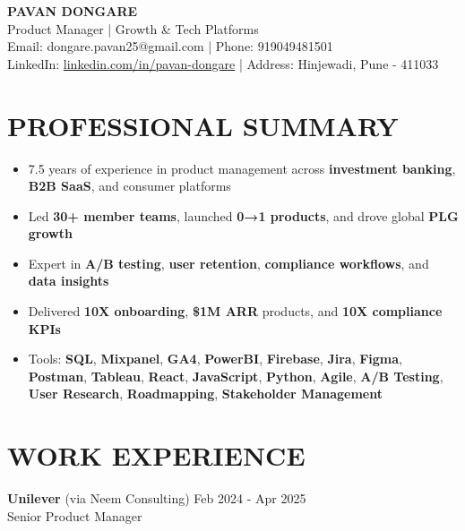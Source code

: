 \documentclass[10pt,a4paper]{article}
\newcommand{\experienceitem}[4]{
    #1 \hfill #2 \\
    #3 \hfill \textit{#4}
}
\begin{document}
\vspace*{1\baselineskip} %

\begin{center}
    \textbf{\Large PAVAN DONGARE} \\
    Product Manager | Growth \& Tech Platforms \\
    Email: dongare.pavan25@gmail.com | Phone: 919049481501 \\
    LinkedIn: \href{https://linkedin.com/in/pavan-dongare}{linkedin.com/in/pavan-dongare} | Address: Hinjewadi, Pune - 411033
\end{center}

\section{PROFESSIONAL SUMMARY}
\begin{itemize}[leftmargin=*,itemsep=1pt,topsep=1pt]
    \item 7.5 years of experience in product management across \textbf{investment banking}, \textbf{B2B SaaS}, and consumer platforms
    \item Led \textbf{30+ member teams}, launched \textbf{0→1 products}, and drove global \textbf{PLG growth}
    \item Expert in \textbf{A/B testing}, \textbf{user retention}, \textbf{compliance workflows}, and \textbf{data insights}
    \item Delivered \textbf{10X onboarding}, \textbf{\$1M ARR} products, and \textbf{10X compliance KPIs}
    \item Tools: \textbf{SQL}, \textbf{Mixpanel}, \textbf{GA4}, \textbf{PowerBI}, \textbf{Firebase}, \textbf{Jira}, \textbf{Figma}, \textbf{Postman}, \textbf{Tableau}, \textbf{React}, \textbf{JavaScript}, \textbf{Python}, \textbf{Agile}, \textbf{A/B Testing}, \textbf{User Research}, \textbf{Roadmapping}, \textbf{Stakeholder Management}
\end{itemize}

\section{WORK EXPERIENCE}

\experienceitem{\textbf{Unilever} (via Neem Consulting)}{Feb 2024 - Apr 2025}{Senior Product Manager}{}
\end{document}
